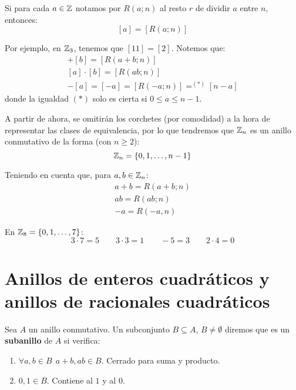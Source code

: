 \begin{notacion}
    Si para cada $a \in \mathbb Z$ notamos por $R(a;n)$ al resto $r$ de dividir $a$ entre $n$, entonces:
    $$[a] = [R(a;n)]$$
    
    Por ejemplo, en $\mathbb Z_3$, tenemos que $[11] = [2]$. Notemos que:
    \begin{gather*}
        [a]+[b] = [R(a+b;n)] \\
        [a]\cdot [b] = [R(ab;n)] \\
        -[a] = [-a] = [R(-a;n)] \mathop{=}^{(\ast)} [n-a]
    \end{gather*}
    donde la igualdad $(\ast)$ solo es cierta si $0\leq a \leq n-1$.
\end{notacion}
\begin{notacion}
    A partir de ahora, se omitirán los corchetes (por comodidad) a la hora de representar las clases de equivalencia, por lo que tendremos que $\mathbb Z_n$ es un anillo conmutativo de la forma (con $n \geq 2$):
    $$\mathbb Z_n = \{0, 1, \ldots, n-1\}$$

    Teniendo en cuenta que, para $a,b\in \mathbb Z_n$:
    \begin{gather*}
        a+b = R(a+b;n) \\
        ab = R(ab;n) \\
        -a = R(-a,n)
    \end{gather*}
\end{notacion}

\begin{ejemplo}
    En $\mathbb Z_8 = \{0, 1, \ldots, 7\}$:
    \begin{equation*}
        3 \cdot 7 = 5
        \qquad
        3 \cdot 3 = 1
        \qquad 
        -5 = 3
        \qquad 
        2 \cdot 4 = 0
    \end{equation*}
\end{ejemplo}

\section{Anillos de enteros cuadráticos y anillos de racionales cuadráticos}
\begin{definicion}[Subanillo]
    Sea $A$ un anillo conmutativo. Un subconjunto $B \subseteq A$, $B \neq \emptyset$ diremos que es un \textbf{subanillo} de $A$ si verifica:
    \begin{enumerate}
        \item $\forall a,b \in B~~a+b, ab \in B$. Cerrado para suma y producto.
        \item $0,1 \in B$. Contiene al $1$ y al $0$.
    \end{enumerate}
\end{definicion}

